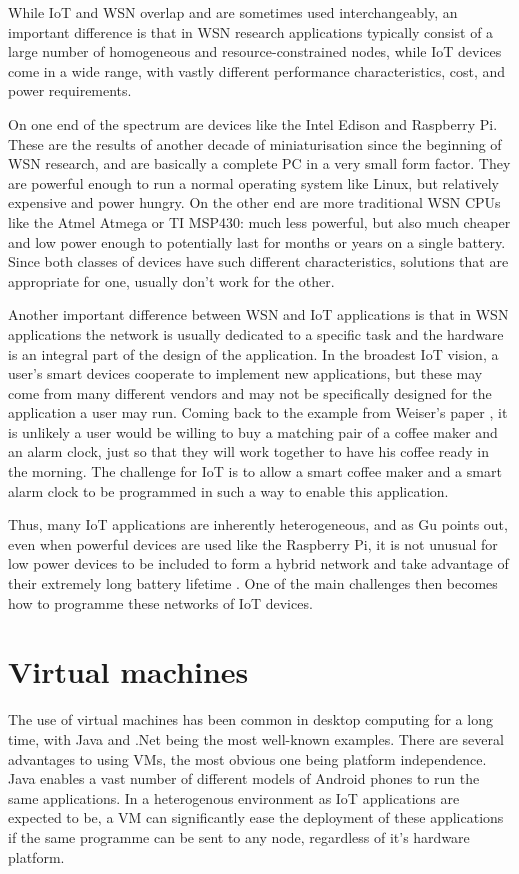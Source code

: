 While IoT and WSN overlap and are sometimes used interchangeably, an important difference is that in WSN research applications typically consist of a large number of homogeneous and resource-constrained nodes, while IoT devices come in a wide range, with vastly different performance characteristics, cost, and power requirements.

On one end of the spectrum are devices like the Intel Edison and Raspberry Pi. These are the results of another decade of miniaturisation since the beginning of WSN research, and are basically a complete PC in a very small form factor. They are powerful enough to run a normal operating system like Linux, but relatively expensive and power hungry. On the other end are more traditional WSN CPUs like the Atmel Atmega or TI MSP430: much less powerful, but also much cheaper and low power enough to potentially last for months or years on a single battery. Since both classes of devices have such different characteristics, solutions that are appropriate for one, usually don't work for the other.

Another important difference between WSN and IoT applications is that in WSN applications the network is usually dedicated to a specific task and the hardware is an integral part of the design of the application. In the broadest IoT vision, a user's smart devices cooperate to implement new applications, but these may come from many different vendors and may not be specifically designed for the application a user may run. Coming back to the example from Weiser's paper \cite{Weiser:1991wz}, it is unlikely a user would be willing to buy a matching pair of a coffee maker and an alarm clock, just so that they will work together to have his coffee ready in the morning. The challenge for IoT is to allow a smart coffee maker and a smart alarm clock to be programmed in such a way to enable this application.

Thus, many IoT applications are inherently heterogeneous, and as Gu points out, even when powerful devices are used like the Raspberry Pi, it is not unusual for low power devices to be included to form a hybrid network and take advantage of their extremely long battery lifetime \cite{Gu:2006ww}. One of the main challenges then becomes how to programme these networks of IoT devices.



\section{Virtual machines}
The use of virtual machines has been common in desktop computing for a long time, with Java and .Net being the most well-known examples. There are several advantages to using VMs, the most obvious one being platform independence. Java enables a vast number of different models of Android phones to run the same applications. In a heterogenous environment as IoT applications are expected to be, a VM can significantly ease the deployment of these applications if the same programme can be sent to any node, regardless of it's hardware platform.

